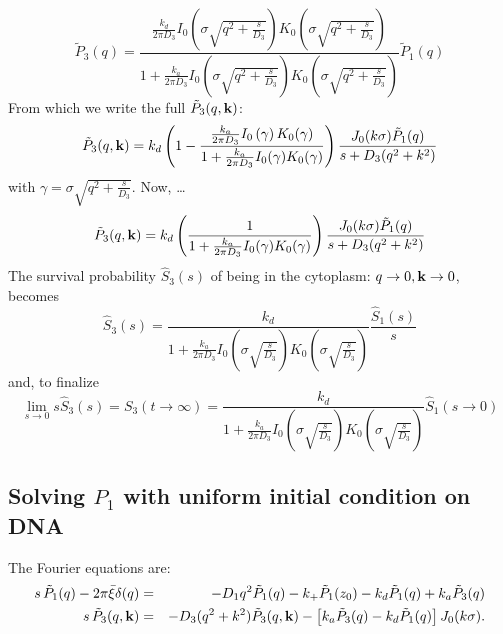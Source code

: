 \documentclass[a4paper,10pt]{article}
\begin{document}
\begin{equation}
 \tilde{P}_3(q) = \frac{\frac{k_d}{2 \pi D_3} I_{0}\left( \sigma \sqrt{q^2 + \frac{s}{D_3}} \right) K_{0} \left( \sigma \sqrt{q^2 + \frac{s}{D_3}}\right) }{1+\frac{k_a}{2 \pi D_3} I_{0}\left( \sigma \sqrt{q^2 + \frac{s}{D_3}} \right) K_{0}\left( \sigma \sqrt{q^2 + \frac{s}{D_3}} \right) } \tilde{P}_1(q) 
\end{equation}
From which we write the full $\tilde{P}_3(q,{\bf k})$:
\begin{equation}
 \tilde{P}_3(q,{\bf k}) = k_d \left( 1 - \frac{\frac{k_a}{2 \pi D_3} I_{0}\left( \gamma \right) K_{0}( \gamma ) }{1+\frac{k_a}{2 \pi D_3} I_{0}( \gamma ) K_{0}( \gamma ) } \right) \frac{J_{0}(k \sigma) \tilde{P}_1(q)}{{s + D_3(q^2 + k^2)}}
\end{equation}
with $\gamma = \sigma \sqrt{q^2 + \frac{s}{D_3}}$. Now, \ldots
\begin{equation}
 \tilde{P}_3(q,{\bf k}) = k_d \left( \frac{1}{1+\frac{k_a}{2 \pi D_3} I_{0}( \gamma ) K_{0}( \gamma ) } \right) \frac{J_{0}(k \sigma) \tilde{P}_1(q)}{{s + D_3(q^2 + k^2)}}
\end{equation}
The survival probability $\hat{S}_3(s)$ of being in the cytoplasm: $q\to0,{\bf k}\to 0$, becomes
\begin{equation}
 \hat{S}_3(s) = \frac{k_d}{1+\frac{k_a}{2 \pi D_3} I_{0}( \sigma \sqrt{\frac{s}{D_3}} ) K_{0}( \sigma \sqrt{\frac{s}{D_3}} ) } \frac{\hat{S}_1(s)}{s}
\end{equation}
and, to finalize
\begin{equation}
 \lim_{s\to0} s \hat{S}_3(s) = S_3(t\to\infty) =  \frac{k_d}{1+\frac{k_a}{2 \pi D_3} I_{0}( \sigma \sqrt{\frac{s}{D_3}} ) K_{0}( \sigma \sqrt{\frac{s}{D_3}} )} \hat{S}_1(s\to0)
\end{equation}

\subsection{Solving $P_1$ with uniform initial condition on DNA}
The Fourier equations are:
\begin{eqnarray*}
 s \, \tilde{P}_1(q) - 2 \pi \bar{\xi} \delta(q) & = & - D_1 q^2 \tilde{P}_1(q) - k_+ \tilde{P}_1(z_0) - k_d \tilde{P}_1(q) + k_a \tilde{P}_3(q) \\
 s \, \tilde{P}_3(q,{\bf k}) & = & - D_3 (q^2 + k^2) \tilde{P}_3(q, {\bf k}) - \left[ k_a \tilde{P}_3(q) - k_d \tilde{P}_1(q) \right] J_{0}(k \sigma). 
\end{eqnarray*}
\end{document}
